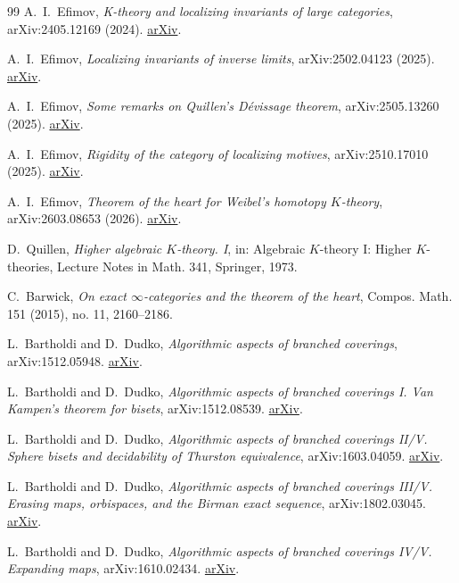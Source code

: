 \documentclass[11pt,a4paper,oneside,openany]{book}
\theoremstyle{definition}
\theoremstyle{remark}
\begin{document}
\begin{thebibliography}{99}
A.~I.~Efimov,
\emph{K-theory and localizing invariants of large categories}, arXiv:2405.12169 (2024).
\href{https://arxiv.org/abs/2405.12169}{arXiv}.

A.~I.~Efimov,
\emph{Localizing invariants of inverse limits}, arXiv:2502.04123 (2025).
\href{https://arxiv.org/abs/2502.04123}{arXiv}.

A.~I.~Efimov,
\emph{Some remarks on Quillen's D\'evissage theorem}, arXiv:2505.13260 (2025).
\href{https://arxiv.org/abs/2505.13260}{arXiv}.

A.~I.~Efimov,
\emph{Rigidity of the category of localizing motives}, arXiv:2510.17010 (2025).
\href{https://arxiv.org/abs/2510.17010}{arXiv}.

A.~I.~Efimov,
\emph{Theorem of the heart for Weibel's homotopy $K$-theory}, arXiv:2603.08653 (2026).
\href{https://arxiv.org/abs/2603.08653}{arXiv}.

D.~Quillen,
\emph{Higher algebraic $K$-theory. I}, in: Algebraic $K$-theory I: Higher $K$-theories, Lecture Notes in Math. 341, Springer, 1973.

C.~Barwick,
\emph{On exact $\infty$-categories and the theorem of the heart}, Compos. Math. 151 (2015), no. 11, 2160--2186.

L.~Bartholdi and D.~Dudko,
\emph{Algorithmic aspects of branched coverings}, arXiv:1512.05948.
\href{https://arxiv.org/abs/1512.05948}{arXiv}.

L.~Bartholdi and D.~Dudko,
\emph{Algorithmic aspects of branched coverings I. Van Kampen's theorem for bisets}, arXiv:1512.08539.
\href{https://arxiv.org/abs/1512.08539}{arXiv}.

L.~Bartholdi and D.~Dudko,
\emph{Algorithmic aspects of branched coverings II/V. Sphere bisets and decidability of Thurston equivalence}, arXiv:1603.04059.
\href{https://arxiv.org/abs/1603.04059}{arXiv}.

L.~Bartholdi and D.~Dudko,
\emph{Algorithmic aspects of branched coverings III/V. Erasing maps, orbispaces, and the Birman exact sequence}, arXiv:1802.03045.
\href{https://arxiv.org/abs/1802.03045}{arXiv}.

L.~Bartholdi and D.~Dudko,
\emph{Algorithmic aspects of branched coverings IV/V. Expanding maps}, arXiv:1610.02434.
\href{https://arxiv.org/abs/1610.02434}{arXiv}.


\end{thebibliography}
\end{document}
